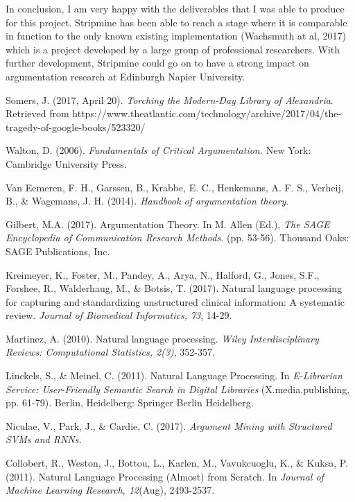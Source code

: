 \documentclass[12pt,a4paper]{article}
\begin{document}
In conclusion, I am very happy with the deliverables that I was able to produce for this project. Stripmine has been able to reach a stage where it is comparable in function to the only known existing implementation (Wachsmuth at al, 2017) which is a project developed by a large group of professional researchers. With further development, Stripmine could go on to have a strong impact on argumentation research at Edinburgh Napier University.


\newpage
\begin{thebibliography}{9}

  Somers, J. (2017, April 20). \textit{Torching the Modern-Day Library of Alexandria}. Retrieved from https://www.theatlantic.com/technology/archive/2017/04/the-tragedy-of-google-books/523320/

  Walton, D. (2006).
  \textit{Fundamentals of Critical Argumentation.}
  New York: Cambridge University Press.
  
  Van Eemeren, F. H., Garssen, B., Krabbe, E. C., Henkemans, A. F. S., Verheij, B., \& Wagemans, J. H. (2014). \textit{Handbook of argumentation theory}.

  Gilbert, M.A. (2017).
  Argumentation Theory. In M. Allen (Ed.), \textit{The SAGE Encyclopedia of Communication Research Methods.} (pp. 53-56). Thousand Oaks: SAGE Publications, Inc.

  Kreimeyer, K., Foster, M., Pandey, A., Arya, N., Halford, G., Jones, S.F., Forshee, R., Walderhaug, M., \& Botsis, T. (2017).
  Natural language processing for capturing and standardizing unstructured clinical information: A systematic review. \textit{Journal of Biomedical Informatics, 73}, 14-29.
  
  Martinez, A. (2010).
  Natural language processing. \textit{Wiley Interdisciplinary Reviews: Computational Statistics, 2(3)}, 352-357.

  Linckels, S., \& Meinel, C. (2011).
  Natural Language Processing. In \textit{E-Librarian Service: User-Friendly Semantic Search in Digital Libraries} (X.media.publishing, pp. 61-79). Berlin, Heidelberg: Springer Berlin Heidelberg.
  
  Niculae, V., Park, J., \& Cardie, C. (2017). \textit{Argument Mining with Structured SVMs and RNNs.}
  
  Collobert, R., Weston, J., Bottou, L., Karlen, M., Vavukcuoglu, K., \& Kuksa, P. (2011).
  Natural Language Processing (Almost) from Scratch. In \textit{Journal of Machine Learning Research, 12}(Aug), 2493-2537.


\end{thebibliography}
\end{document}
